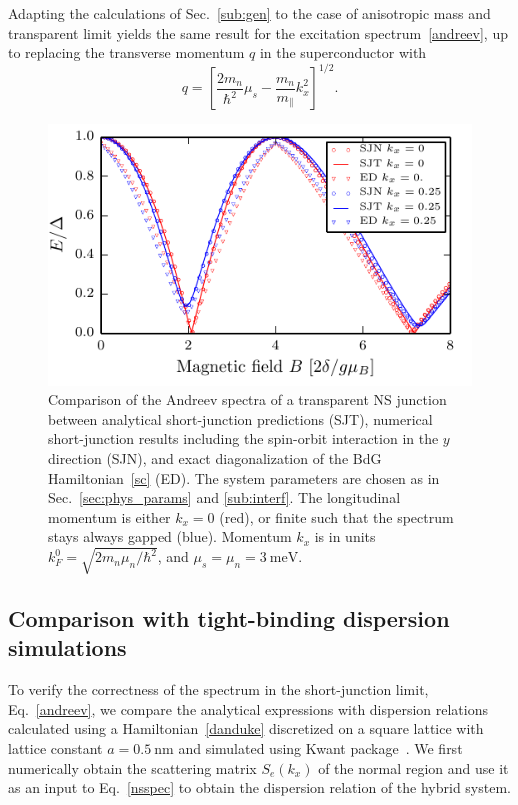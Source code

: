 Adapting the calculations of Sec.~\ref{sub:gen} to the case of anisotropic mass and transparent limit yields the same result for the excitation spectrum~\eqref{andreev}, up to replacing the transverse momentum $q$ in the superconductor with
\begin{equation}\label{aniso}
q = \left[\frac{2m_n}{\hbar^2}\mu_s
-\frac{m_n}{m_\parallel}k_x^2\right]^{1/2}.
\end{equation}

\begin{figure}
\begin{center}
\includegraphics[width=0.7\columnwidth]{chapter_shortjunction/figures/spec_comp}
\caption{Comparison of the Andreev spectra of a transparent NS junction between analytical short-junction predictions (SJT), numerical short-junction results including the spin-orbit interaction in the $y$ direction (SJN), and exact diagonalization of the BdG Hamiltonian~\eqref{sc} (ED).
The system parameters are chosen as in Sec.~\ref{sec:phys_params} and \ref{sub:interf}.
The longitudinal momentum is either $k_x=0$ (red), or finite such that the spectrum stays always gapped (blue).
Momentum $k_x$ is in units $k_F^0=\sqrt{2m_n\mu_n/\hbar^2}$, and $\mu_s=\mu_n=\SI{3}{\meV}$.}
\label{fig:spec_comp}
\end{center}
\end{figure}

\subsection{Comparison with tight-binding dispersion simulations}
To verify the correctness of the spectrum in the short-junction limit, Eq.~\eqref{andreev}, we compare the analytical expressions with dispersion relations calculated using a Hamiltonian~\eqref{danduke} discretized on a square lattice with lattice constant $a=\SI{0.5}{\nm}$ and simulated using Kwant package~\cite{Groth2014}.
We first numerically obtain the scattering matrix $S_e(k_x)$ of the normal region and use it as an input to Eq.~\eqref{nsspec} to obtain the dispersion relation of the hybrid system.

